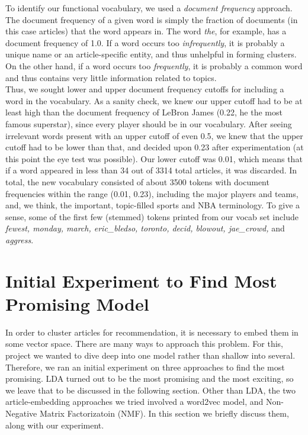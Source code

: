 \documentclass[11pt]{article}
\begin{document}
To identify our functional vocabulary, we used a \textit{document frequency} approach. The document frequency of a given word is simply the fraction of documents (in this case articles) that the word appears in. The word \textit{the}, for example, has a document frequency of 1.0. If a word occurs too \textit{infrequently}, it is probably a unique name or an article-specific entity, and thus unhelpful in forming clusters. On the other hand, if a word occurs too \textit{frequently}, it is probably a common word and thus contains very little information related to topics.  \\

Thus, we sought lower and upper document frequency cutoffs for including a word in the vocabulary.  As a sanity check, we knew our upper cutoff had to be at least high than the document frequency of LeBron James (0.22, he the most famous superstar), since every player should be in our vocabulary. After seeing irrelevant words present with an upper cutoff of even 0.5, we knew that the upper cutoff had to be lower than that, and decided upon 0.23 after experimentation (at this point the eye test was possible). Our lower cutoff was 0.01, which means that if a word appeared in less than 34 out of 3314 total articles, it was discarded.  In total, the new vocabulary consisted of about 3500 tokens with document frequencies within the range (0.01, 0.23), including the major players and teams, and, we think, the important, topic-filled sports and NBA terminology. To give a sense, some of the first few (stemmed) tokens printed from our vocab set include \textit{fewest, monday, march, eric\_bledso, toronto, decid, blowout, jae\_crowd,} and \textit{aggress}.  

\section{Initial Experiment to Find Most Promising Model}
In order to cluster articles for recommendation, it is necessary to embed them in some vector space.  There are many ways to approach this problem.  For this, project we wanted to dive deep into one model rather than shallow into several.  Therefore, we ran an initial experiment on three approaches to find the most promising.  LDA turned out to be the most promising and the most exciting, so we leave that to be discussed in the following section.  Other than LDA, the two article-embedding approaches we tried involved a word2vec model, and Non-Negative Matrix Factorizatoin (NMF).  In this section we briefly discuss them, along with our experiment.
\end{document}
